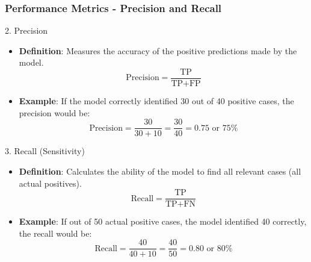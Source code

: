 \documentclass[aspectratio=169]{beamer}
\begin{document}
\begin{frame}[fragile]
    \frametitle{Performance Metrics - Precision and Recall}
    \begin{block}{2. Precision}
        \begin{itemize}
            \item \textbf{Definition}: Measures the accuracy of the positive predictions made by the model.
            \begin{equation}
                \text{Precision} = \frac{\text{TP}}{\text{TP} + \text{FP}}
            \end{equation}
            \item \textbf{Example}: If the model correctly identified 30 out of 40 positive cases, the precision would be:
            \begin{equation}
                \text{Precision} = \frac{30}{30 + 10} = \frac{30}{40} = 0.75 \text{ or } 75\%
            \end{equation}
        \end{itemize}
    \end{block}

    \begin{block}{3. Recall (Sensitivity)}
        \begin{itemize}
            \item \textbf{Definition}: Calculates the ability of the model to find all relevant cases (all actual positives).
            \begin{equation}
                \text{Recall} = \frac{\text{TP}}{\text{TP} + \text{FN}}
            \end{equation}
            \item \textbf{Example}: If out of 50 actual positive cases, the model identified 40 correctly, the recall would be:
            \begin{equation}
                \text{Recall} = \frac{40}{40 + 10} = \frac{40}{50} = 0.80 \text{ or } 80\%
            \end{equation}
        \end{itemize}
    \end{block}
\end{frame}
\end{document}
